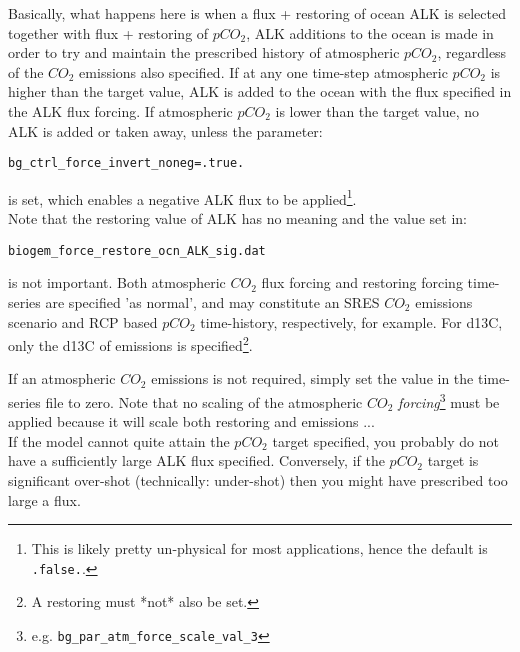 \begin{enumerate}[noitemsep]
\vspace{1mm}
Basically, what happens here is when a flux + restoring of ocean ALK is selected together with flux + restoring of \(pCO_{2}\), ALK additions to the ocean is made in order to try and maintain the prescribed history of atmospheric \(pCO_{2}\), regardless of the \(CO_{2}\) emissions also specified. If at any one time-step atmospheric \(pCO_{2}\) is higher than the target value, ALK is added to the ocean with the flux specified in the ALK flux forcing. If atmospheric \(pCO_{2}\) is lower than the target value, no ALK is added or taken away, unless the parameter:
\vspace{-1mm}\small\begin{verbatim}
bg_ctrl_force_invert_noneg=.true.
\end{verbatim}\normalsize\vspace{-1mm}
is set, which enables a negative ALK flux to be applied\footnote{This is likely pretty un-physical for most applications, hence the default is \texttt{.false.}.}.
\\ Note that the restoring value of ALK has no meaning and the value set in:
\vspace{-1mm}\small\begin{verbatim}
biogem_force_restore_ocn_ALK_sig.dat
\end{verbatim}\normalsize\vspace{-1mm}
is not important.
Both atmospheric \(CO_{2}\) flux forcing and restoring forcing time-series are specified 'as normal', and may constitute an SRES \(CO_{2}\) emissions scenario and RCP based \(pCO_{2}\) time-history, respectively, for example. For d13C, only the d13C of emissions is specified\footnote{A restoring must *not* also be set.}.

If an atmospheric \(CO_{2}\) emissions is not required, simply set the value in the time-series file to zero.
Note that no scaling of the atmospheric \(CO_{2}\) \textit{forcing}\footnote{e.g. \texttt{bg\_par\_atm\_force\_scale\_val\_3}}
must be applied because it will scale both restoring and emissions ...
\\ If the model cannot quite attain the \(pCO_{2}\) target specified, you probably do not have a sufficiently large ALK flux specified. Conversely, if the \(pCO_{2}\) target is significant over-shot (technically: under-shot) then you might have prescribed too large a flux.

\end{enumerate}

%
\newpage
